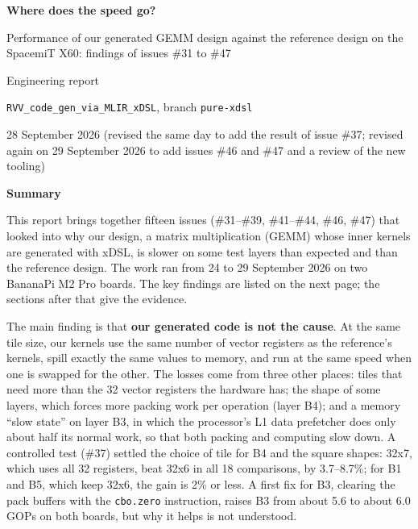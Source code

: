 \documentclass[11pt,a4paper]{article}
\begin{document}
\begin{titlepage}
\centering
\vspace*{2.5cm}
{\LARGE\bfseries Where does the speed go?\par}
\vspace{0.6cm}
{\Large Performance of our generated GEMM design against the reference design on the
SpacemiT X60: findings of issues \#31 to \#47\par}
\vspace{1.2cm}
{\large Engineering report\par}
\vspace{0.4cm}
{\normalsize \texttt{RVV\_code\_gen\_via\_MLIR\_xDSL}, branch \texttt{pure-xdsl}\par}
\vspace{0.2cm}
{\normalsize 28 September 2026 (revised the same day to add the result of issue \#37; revised again on
29 September 2026 to add issues \#46 and \#47 and a review of the new tooling)\par}
\vfill
\begin{minipage}{0.88\linewidth}\setlength{\parskip}{0.8ex}
\textbf{Summary}\par\smallskip
This report brings together fifteen issues (\#31--\#39, \#41--\#44, \#46, \#47) that looked into why our design, a matrix
multiplication (GEMM) whose inner kernels are generated with xDSL, is slower on some test layers than expected and than the
reference design. The work ran from 24 to 29 September 2026 on two BananaPi M2 Pro boards. The key findings are listed on the
next page; the sections after that give the evidence.

The main finding is that \textbf{our generated code is not the cause}. At the same tile size, our kernels use the same number of
vector registers as the reference's kernels, spill exactly the same values to memory, and run at the same speed when one is swapped
for the other. The losses come from three other places: tiles that need more than the 32 vector registers the hardware has; the shape of
some layers, which forces more packing work per operation (layer B4); and a memory ``slow state'' on layer B3, in which the processor's
L1 data prefetcher does only about half its normal work, so that both packing and computing slow down. A controlled test (\#37) settled the
choice of tile for B4 and the square shapes: 32x7, which uses all 32 registers, beat 32x6 in all 18 comparisons, by 3.7--8.7\%; for B1 and B5,
which keep 32x6, the gain is 2\% or less. A first fix for B3, clearing the pack buffers with the \texttt{cbo.zero} instruction, raises B3 from
about 5.6 to about 6.0 GOPs on both boards, but why it helps is not understood.


\end{minipage}
\end{titlepage}
\end{document}
